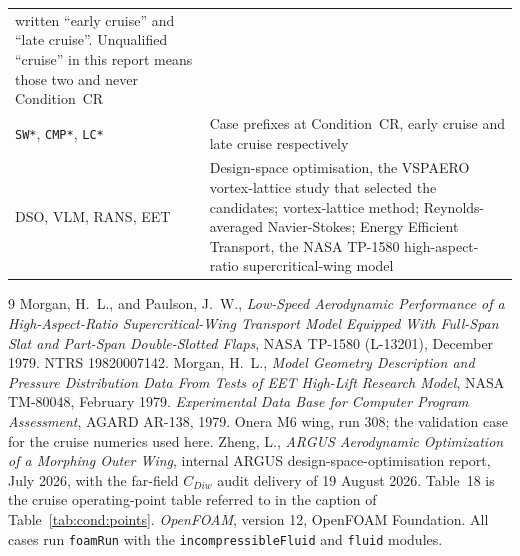 \documentclass[10pt,a4paper]{article}
\begin{document}
{\begin{longtable}{@{}p{}p{}@{}}
  written ``early cruise'' and ``late cruise''. Unqualified ``cruise'' in this report means those
  two and never Condition~CR \\
\texttt{SW*}, \texttt{CMP*}, \texttt{LC*} & Case prefixes at Condition~CR, early cruise and late
  cruise respectively \\
DSO, VLM, RANS, EET & Design-space optimisation, the VSPAERO vortex-lattice study that selected
  the candidates; vortex-lattice method; Reynolds-averaged Navier-Stokes; Energy Efficient
  Transport, the NASA TP-1580 high-aspect-ratio supercritical-wing model \\
\end{longtable}
}









\appendix



{\footnotesize
\begin{thebibliography}{9}
\setlength{\itemsep}{1pt}
 Morgan, H.~L., and Paulson, J.~W., \emph{Low-Speed Aerodynamic Performance of
a High-Aspect-Ratio Supercritical-Wing Transport Model Equipped With Full-Span Slat and
Part-Span Double-Slotted Flaps}, NASA TP-1580 (L-13201), December 1979. NTRS 19820007142.
 Morgan, H.~L., \emph{Model Geometry Description and Pressure Distribution
Data From Tests of EET High-Lift Research Model}, NASA TM-80048, February 1979.
 \emph{Experimental Data Base for Computer Program Assessment}, AGARD
AR-138, 1979. Onera M6 wing, run 308; the validation case for the cruise numerics used here.
 Zheng, L., \emph{ARGUS Aerodynamic Optimization of a Morphing Outer Wing},
internal ARGUS design-space-optimisation report, July 2026, with the far-field $C_{Diw}$ audit
delivery of 19 August 2026. Table~18 is the cruise operating-point table referred to in the
caption of Table~\ref{tab:cond:points}.
 \emph{OpenFOAM}, version 12, OpenFOAM Foundation. All cases run
\texttt{foamRun} with the \texttt{incompressibleFluid} and \texttt{fluid} modules.
\end{thebibliography}
}
\end{document}
